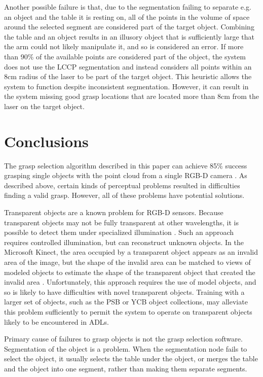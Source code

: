 \documentclass[letterpaper, 10 pt, conference]{ieeeconf}
\begin{document}
Another possible failure is that, due to the segmentation failing to separate e.g. an object and the table it is resting on, all of the points in the volume of space around the selected segment are considered part of the target object. 
Combining the table and an object results in an illusory object that is sufficiently large that the arm could not likely manipulate it, and so is considered an error. 
If more than 90\% of the available points are considered part of the object, the system does not use the LCCP segmentation and instead considers all points within an 8cm radius of the laser to be part of the target object. 
This heuristic allows the system to function despite inconsistent segmentation. 
However, it can result in the system missing good grasp locations that are located more than 8cm from the laser on the target object. 

\section{Conclusions}

The grasp selection algorithm described in this paper can achieve 85\% success grasping single objects with the point cloud from a single RGB-D camera \cite{Using Geometry to Detect Grasp Poses in 3D Point Clouds}.
As described above, certain kinds of perceptual problems resulted in difficulties finding a valid grasp. 
However, all of these problems have potential solutions. 

Transparent objects are a known problem for RGB-D sensors. 
Because transparent objects may not be fully transparent at other wavelengths, it is possible to detect them under specialized illumination \cite{lysenkov2012recognition}.
Such an approach requires controlled illumination, but can reconstruct unknown objects.
In the Microsoft Kinect, the area occupied by a transparent object appears as an invalid area of the image, but the shape of the invalid area can be matched to views of modeled objects to estimate the shape of the transparent object that created the invalid area \cite{klank2011transparent}.
Unfortunately, this approach requires the use of model objects, and so is likely to have difficulties with novel transparent objects. 
Training with a larger set of objects, such as the PSB or YCB object collections, may alleviate this problem sufficiently to permit the system to operate on transparent objects likely to be encountered in ADLs. 



Primary cause of failures to grasp objects is not the grasp selection software. 
Segmentation of the object is a problem. 
When the segmentation node fails to select the object, it usually selects the table under the object, or merges the table and the object into one segment, rather than making them separate segments. 
\end{document}
